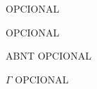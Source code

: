 \listoffigures*
OPCIONAL
\cleardoublepage

\listoftables*
OPCIONAL
\cleardoublepage

\begin{siglas}
  \item[ABNT] OPCIONAL
\end{siglas}

\begin{simbolos}
  \item[$ \Gamma $] OPCIONAL
\end{simbolos}
